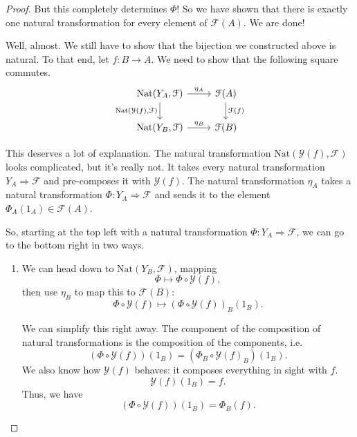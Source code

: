 \documentclass[a4paper]{report}
\newcommand{\Nat}{\mathrm{Nat}}
\theoremstyle{definition}
\theoremstyle{plain}
\theoremstyle{remark}
\begin{document}
\begin{proof}
  But this completely determines $\Phi$! So we have shown that there is exactly one natural transformation for every element of $\mathcal{F}(A)$. We are done!

  Well, almost. We still have to show that the bijection we constructed above is natural. To that end, let $f\colon B \to A$. We need to show that the following square commutes.
  \begin{equation*}
    \begin{tikzcd}
      \Nat(Y_{A}, \mathcal{F})
      \arrow[r, "\eta_{A}"]
      \arrow[d, swap, "{\Nat(\mathcal{Y}(f), \mathcal{F})}"]
      & \mathcal{F}(A)
      \arrow[d, "\mathcal{F}(f)"]
      \\
      \Nat(Y_{B}, \mathcal{F})
      \arrow[r, "\eta_{B}"]
      & \mathcal{F}(B)
    \end{tikzcd}
  \end{equation*}

  This deserves a lot of explanation. The natural transformation $\Nat(\mathcal{Y}(f), \mathcal{F})$ looks complicated, but it's really not. It takes every natural transformation $Y_{A} \Rightarrow \mathcal{F}$ and pre-composes it with $\mathcal{Y}(f)$. The natural transformation $\eta_{A}$ takes a natural transformation $\Phi\colon Y_{A} \Rightarrow \mathcal{F}$ and sends it to the element $\Phi_{A}(1_{A}) \in \mathcal{F}(A)$.

  So, starting at the top left with a natural transformation $\Phi\colon Y_{A} \Rightarrow \mathcal{F}$, we can go to the bottom right in two ways.
  \begin{enumerate}
    \item We can head down to $\Nat(Y_{B}, \mathcal{F})$, mapping 
      \begin{equation*}
        \Phi \mapsto \Phi \circ \mathcal{Y}(f),
      \end{equation*}
      then use $\eta_{B}$ to map this to $\mathcal{F}(B)$:
      \begin{equation*}
        \Phi \circ \mathcal{Y}(f) \mapsto (\Phi \circ \mathcal{Y}(f))_{B}(1_{B}).
      \end{equation*}

      We can simplify this right away. The component of the composition of natural transformations is the composition of the components, i.e.
      \begin{equation*}
        (\Phi \circ \mathcal{Y}(f))(1_{B}) = (\Phi_{B} \circ \mathcal{Y}(f)_{B})(1_{B}).
      \end{equation*}
      We also know how $\mathcal{Y}(f)$ behaves: it composes everything in sight with $f$.
      \begin{equation*}
        \mathcal{Y}(f)(1_{B}) = f.
      \end{equation*}
      Thus, we have
      \begin{equation*}
        (\Phi \circ \mathcal{Y}(f))(1_{B}) = \Phi_{B}(f).
      \end{equation*}


\end{enumerate}
\end{proof}
\end{document}

